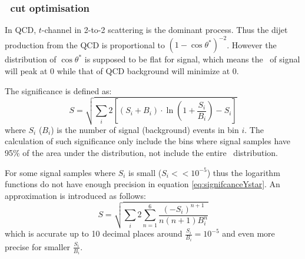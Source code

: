 \subsubsection{\ystar\ cut optimisation}
\label{section:ystarCutOptimization}


In QCD, $t$-channel in 2-to-2 scattering is the dominant process. Thus the dijet production from the QCD is proportional to $\displaystyle{(1-\cos\theta^{*})^{-2}}$. However the distribution of $\cos\theta^{*}$ is supposed to be flat for signal, which means the \ystar\ of signal will peak at 0 while that of QCD background will minimize at 0.


The significance is defined as: 
\begin{equation}
\label{eq:signifcanceYstar} %
S  = \sqrt{\sum_{i}{2\left[ \left(S_{i}+B_{i} \right)\cdot \ln \left(1+\frac{S_{i}}{B_{i}}\right)-S_{i}\right]}}
\end{equation}
where $S_i$ ($B_i$) is the number of signal (background) events in bin $i$. 
The calculation of such significance only include the bins where signal samples have 95\% of the area under the distribution, not include the entire \mjj\ distribution.

For some signal samples where $S_i$ is small ($S_i << 10^{-5}$) thus the logarithm functions do not have
enough precision in equation \ref{eq:signifcanceYstar}. An approximation is introduced as follows:
\begin{equation}
S = \sqrt{\sum_{i}{2\sum_{n=1}^{6}{\frac{(-S_i)^{n+1}}{n \left(n+1 \right) B_i^n}}}}
\end{equation}
which is accurate up to 10 decimal places around $\frac{S_i}{B_i} = 10^{-5}$ and even more precise for smaller $\frac{S_i}{B_i}$.

